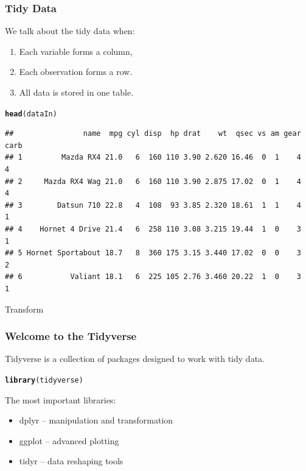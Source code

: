 \documentclass[12pt]{beamer}\usepackage[]{graphicx}\usepackage[]{color}
\makeatletter
\newcommand{\hlstd}[1]{\textcolor[rgb]{0.345,0.345,0.345}{#1}}%
\newcommand{\hlkwd}[1]{\textcolor[rgb]{0.737,0.353,0.396}{\textbf{#1}}}%
\newenvironment{kframe}{%
 \def\at@end@of@kframe{}%
 \ifinner\ifhmode%
  \def\at@end@of@kframe{\end{minipage}}%
  \begin{minipage}{\columnwidth}%
 \fi\fi%
 \def\FrameCommand##1{\hskip\@totalleftmargin \hskip-\fboxsep
 \colorbox{shadecolor}{##1}\hskip-\fboxsep
     \hskip-\linewidth \hskip-\@totalleftmargin \hskip\columnwidth}%
 \MakeFramed {\advance\hsize-\width
   \@totalleftmargin\z@ \linewidth\hsize
   \@setminipage}}%
 {\par\unskip\endMakeFramed%
 \at@end@of@kframe}
\newenvironment{knitrout}{}{} %
\makeatother
\begin{document}
\begin{frame}[fragile]\large
\frametitle{Tidy Data}
We talk about the tidy data when:
\begin{enumerate}
 \item Each variable forms a column,
 \item Each observation forms a row.
 \item All data is stored in one table.
\end{enumerate}

\begin{knitrout}\footnotesize
{}\color{fgcolor}\begin{kframe}
\begin{alltt}
\hlkwd{head}\hlstd{(dataIn)}
\end{alltt}
\begin{verbatim}
##                name  mpg cyl disp  hp drat    wt  qsec vs am gear carb
## 1         Mazda RX4 21.0   6  160 110 3.90 2.620 16.46  0  1    4    4
## 2     Mazda RX4 Wag 21.0   6  160 110 3.90 2.875 17.02  0  1    4    4
## 3        Datsun 710 22.8   4  108  93 3.85 2.320 18.61  1  1    4    1
## 4    Hornet 4 Drive 21.4   6  258 110 3.08 3.215 19.44  1  0    3    1
## 5 Hornet Sportabout 18.7   8  360 175 3.15 3.440 17.02  0  0    3    2
## 6           Valiant 18.1   6  225 105 2.76 3.460 20.22  1  0    3    1
\end{verbatim}
\end{kframe}
\end{knitrout}

\end{frame}


\begin{frame}\Huge\centering
Transform
\end{frame}


\begin{frame}[fragile]\large
\frametitle{Welcome to the Tidyverse}

Tidyverse is a collection of packages designed to work with tidy data.
\begin{knitrout}
\color{fgcolor}\begin{kframe}
\begin{alltt}
\hlkwd{library}\hlstd{(tidyverse)}
\end{alltt}
\end{kframe}
\end{knitrout}

The most important libraries:
\begin{itemize}
 \item dplyr -- manipulation and transformation
 \item ggplot -- advanced plotting
 \item tidyr -- data reshaping tools
\end{itemize}


\end{frame}
\end{document}
